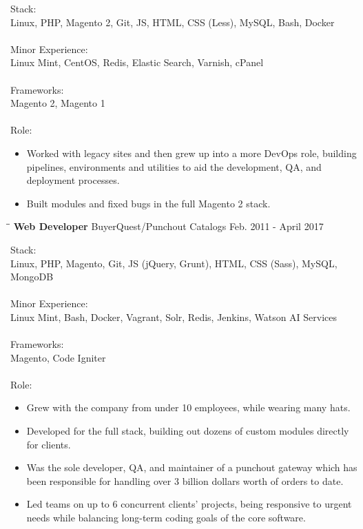 \documentclass{res}
\begin{document}
\begin{resume}
    Stack: \\
	Linux, PHP, Magento 2, Git, JS, HTML, CSS (Less), MySQL, Bash, Docker \\
	\\
	Minor Experience: \\
	Linux Mint, CentOS, Redis, Elastic Search, Varnish, cPanel \\
	\\
	Frameworks: \\
	Magento 2, Magento 1 \\
	\\
	Role: \\
	\vspace{-0.15in}	
	\begin{itemize}
		\item Worked with legacy sites and then grew up into a more DevOps role, building pipelines, environments and utilities to aid the development, QA, and deployment processes.
		\item Built modules and fixed bugs in the full Magento 2 stack.
	\end{itemize}
    
   
   \begin{tabbing}
   		\hspace{2.0in}\= \hspace{2.7in}\= \kill %
    	\textbf{Web Developer} \>BuyerQuest/Punchout Catalogs     \>Feb. 2011 - April 2017\\
   \end{tabbing}\vspace{-20pt}      %
   
    Stack: \\
	Linux, PHP, Magento, Git, JS (jQuery, Grunt), HTML, CSS (Sass), MySQL, MongoDB \\
	\\
	Minor Experience: \\
	Linux Mint, Bash, Docker, Vagrant, Solr, Redis, Jenkins, Watson AI Services \\
	\\
	Frameworks: \\
	Magento, Code Igniter \\
	\\
	Role: \\
	\vspace{-0.15in}	
	\begin{itemize}
		\item Grew with the company from under 10 employees, while wearing many hats.
		\item Developed for the full stack, building out dozens of custom modules directly for clients.
		\item Was the sole developer, QA, and maintainer of a punchout gateway which has been responsible for handling over 3 billion dollars worth of orders to date.
		\item Led teams on up to 6 concurrent clients' projects, being responsive to urgent needs while balancing long-term coding goals of the core software.
	\end{itemize}
	

\end{resume}
\end{document}
